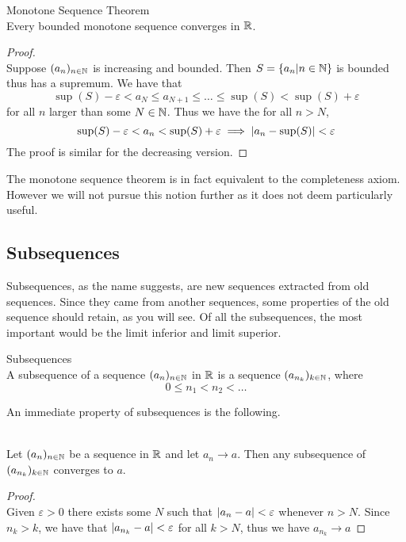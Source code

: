 \documentclass[a4paper]{article}
\begin{document}
\begin{thm}{Monotone Sequence Theorem}{}\\ Every bounded monotone sequence converges in $\mathbb{R}$. 
\begin{proof}\\ Suppose $(a_n)_{n\in\mathbb{N}}$ is increasing and bounded. Then $S=\{a_n|n\in\mathbb{N}\}$ is bounded thus has a supremum. We have that $$\sup(S)-\varepsilon< a_N\leq a_{N+1}\leq\dots\leq\sup(S)<\sup(S)+\varepsilon$$ for all $n$ larger than some $N\in\mathbb{N}$. Thus we have the for all $n>N$, $$\sup(S)-\varepsilon<a_n<\sup(S)+\varepsilon\implies\abs{a_n-\sup(S)}<\varepsilon$$ The proof is similar for the decreasing version. 
\end{proof}
\end{thm}

The monotone sequence theorem is in fact equivalent to the completeness axiom. However we will not pursue this notion further as it does not deem particularly useful. 

\subsection{Subsequences}
Subsequences, as the name suggests, are new sequences extracted from old sequences. Since they came from another sequences, some properties of the old sequence should retain, as you will see. Of all the subsequences, the most important would be the limit inferior and limit superior. 

\begin{defn}{Subsequences}{}\\ A subsequence of a sequence $(a_n)_{n\in\mathbb{N}}$ in $\mathbb{R}$ is a sequence $(a_{n_k})_{k\in\mathbb{N}}$, where $$0\leq n_1<n_2<\dots$$
\end{defn}

An immediate property of subsequences is the following. 

\begin{prp}{}{}\\ Let $(a_n)_{n\in\mathbb{N}}$ be a sequence in $\mathbb{R}$ and let $a_n\to a$. Then any subsequence of $(a_{n_k})_{k\in\mathbb{N}}$ converges to $a$. 
\begin{proof}\\ Given $\varepsilon>0$ there exists some $N$ such that $\abs{a_n-a}<\varepsilon$ whenever $n>N$. Since $n_k>k$, we have that $\abs{a_{n_k}-a}<\varepsilon$ for all $k>N$, thus we have $a_{n_k}\to a$
\end{proof}
\end{prp}
\end{document}
